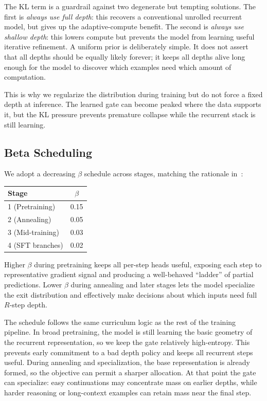\documentclass[11pt,a4paper]{article}
\begin{document}
The KL term is a guardrail against two degenerate but tempting solutions. The
first is \emph{always use full depth}: this recovers a conventional unrolled
recurrent model, but gives up the adaptive-compute benefit. The second is
\emph{always use shallow depth}: this lowers compute but prevents the model from
learning useful iterative refinement. A uniform prior is deliberately simple. It
does not assert that all depths should be equally likely forever; it keeps all
depths alive long enough for the model to discover which examples need which
amount of computation.

This is why we regularize the distribution during training but do not force a
fixed depth at inference. The learned gate can become peaked where the data
supports it, but the KL pressure prevents premature collapse while the recurrent
stack is still learning.

\subsection{Beta Scheduling}

We adopt a decreasing $\beta$ schedule across stages,
matching the rationale in~\cite{ouro2025}:

\begin{center}
\begin{tabular}{lc}
\toprule
Stage & $\beta$ \\
\midrule
1 (Pretraining) & 0.15 \\
2 (Annealing) & 0.05 \\
3 (Mid-training) & 0.03 \\
4 (SFT branches) & 0.02 \\
\bottomrule
\end{tabular}
\end{center}

Higher $\beta$ during pretraining keeps all per-step heads useful, exposing
each step to representative gradient signal and producing a well-behaved
``ladder'' of partial predictions. Lower $\beta$ during annealing and
later stages lets the model specialize the exit distribution and effectively
make decisions about which inputs need full $R$-step depth.

The schedule follows the same curriculum logic as the rest of the training
pipeline. In broad pretraining, the model is still learning the basic geometry of
the recurrent representation, so we keep the gate relatively high-entropy. This
prevents early commitment to a bad depth policy and keeps all recurrent steps
useful. During annealing and specialization, the base representation is already
formed, so the objective can permit a sharper allocation. At that point the gate
can specialize: easy continuations may concentrate mass on earlier depths, while
harder reasoning or long-context examples can retain mass near the final step.
\end{document}
